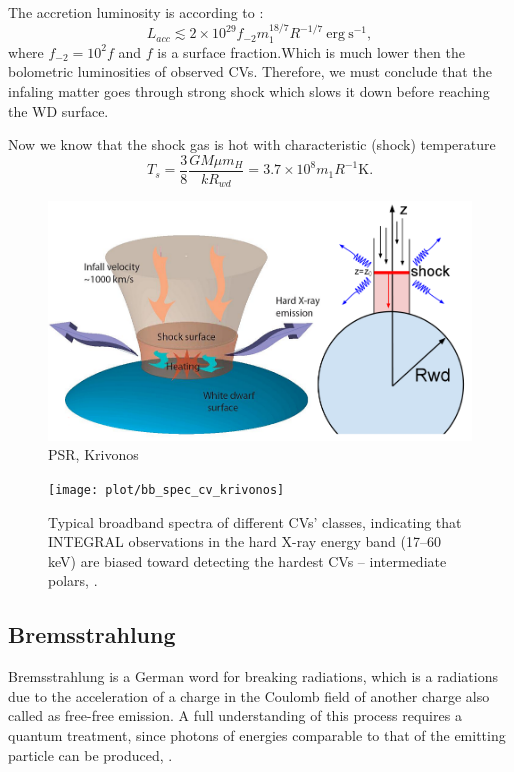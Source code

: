 \documentclass[oneside,a4paper,11pt]{report}
\begin{document}
The accretion luminosity is according to \citet{accpower:1}:
\begin{equation}
\label{lacc}
L_{acc} \lesssim 2 \times 10^{29}f_{-2}m_1^{18/7}R^{-1/7} \: \mathrm{erg \: s^{-1}},
\end{equation}
where $f_{-2} = 10^2 f$ and $f$ is a surface fraction.Which is much lower then the bolometric luminosities 
of observed CVs. Therefore, we must conclude that the infaling matter goes through strong shock which 
slows it down before reaching the WD surface.    

Now we know that the shock gas is hot with characteristic (shock) temperature
\begin{equation}
 T_s = \frac{3}{8}\frac{G M \mu m_H}{k R_{wd}}=3.7 \times 10^8 m_1 R^{-1} \mathrm{K}. 
\end{equation}


\begin{figure}[hbt]
\centering
\includegraphics[totalheight=5cm]{plot/psr2}
\caption{PSR, Krivonos \citet{krivonos_pres}}
\label{psr1} 
\end{figure}

\begin{figure}[hbt]
\centering
\texttt{[image: plot/bb\_spec\_cv\_krivonos]}
\caption{Typical broadband spectra of different CVs' classes, indicating that INTEGRAL observations in 
the hard X-ray energy band (17–60 keV) are biased toward detecting the hardest CVs – intermediate polars, 
\citet{2008A&A...489.1121R}.}
\label{kriv_1} 
\end{figure}



\subsection{Bremsstrahlung}
Bremsstrahlung is a German word for breaking radiations, which is a radiations due to the acceleration 
of a charge in the Coulomb field of another charge also called as free-free emission. A full 
understanding of this process requires a quantum treatment, since photons of energies comparable 
to that of the emitting particle can be produced, \citet{rybicki:1}.
\end{document}
